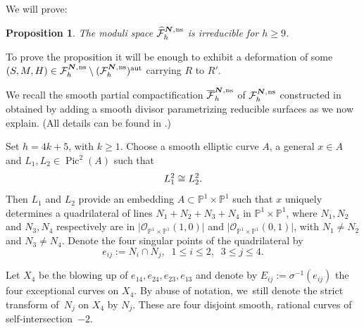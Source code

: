 \documentclass[JEP,XML,SOM,Unicode,NoEqCountersInSection,published]{cedram}
\newcommand{\aut}{{\mathrm{aut}}}
\newcommand{\ns}{{\mkern1mu\mathrm{ns}}}
\newcommand{\bN}{\boldsymbol{N}}
\theoremstyle{plain}
\newtheorem{prop}[thm]{Proposition}
\theoremstyle{definition}
\DeclareMathOperator{\Pic}{Pic}
\newcommand\PP{{\mathbb P}}
\newcommand\F{{\mathcal F}}
\let\x\times
\begin{document}
We will prove:

\begin{prop} \label{prop:app}
The moduli space $\widehat{\F}_h^{\bN,\ns}$ is irreducible for $h \geq 9$.
\end{prop}

To prove the proposition it will be enough to exhibit a deformation of some $(S,M,H) \in \F_h^{\bN,\ns} \setminus (\F_h^{\bN,\ns})^\aut$ carrying $R$ to $R'$.

We recall the smooth partial compactification $\overline{\F}_h^{\bN,\ns}$ of $\F_h^{\bN,\ns}$ constructed in \cite[Cor.\,5.9]{KLV1} obtained by adding a smooth divisor parametrizing reducible surfaces as we now explain. (All details can be found in \cite[\S 5]{KLV1}.)

Set $h=4k+5$, with $k \geq 1$.
Choose a smooth elliptic curve $A$, a general $x \in A$ and $L_1, L_2 \in \Pic^2(A)$ such that
\begin{equation}\label{eins}L_1^{\*2} \cong L_2^{\*2}.\end{equation} Then $L_1$ and $L_2$ provide an embedding $A\subset\PP^1 \x \PP^1$ such that $x$ uniquely determines a quadrilateral of lines $N_1+N_2+N_3+N_4$ in $\PP^1 \x \PP^1$,
where $N_1, N_2$ and $N_3 , N_4$ respectively are in $\vert \mathcal O_{\PP^1 \x \PP^1}(1,0) \vert$ and $\vert \mathcal O_{\PP^1 \x \PP^1}(0, 1) \vert$, with $N_1 \neq N_2$ and $N_3 \neq N_4$.
Denote the four singular points of the quadrilateral by
\[
 e_{ij} := N_i \cap N_j, \;\; 1 \leq i \leq 2, \;\; 3 \leq j \leq 4.
\]

\begin{center}
\end{center}

Let $X_4$
be the blowing up of $e_{14},e_{24}, e_{23}, e_{13}$ and denote by
$E_{ij} := \sigma^{-1}(e_{ij})$ the four exceptional curves on $X_4$. By abuse of notation, we~still denote the strict transform of~$N_j$ on $X_4$ by $N_j$.
These are four disjoint smooth, rational curves of self-intersection~$-2$.
\end{document}
